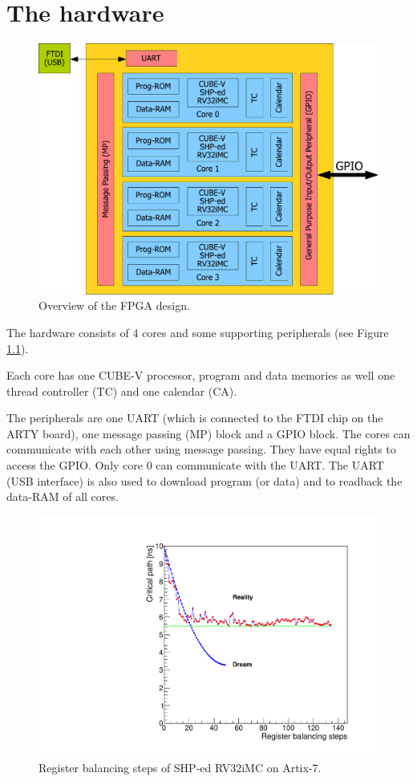 \chapter{The hardware}
\label{atomics}

\begin{figure}[!t]
	\centering
	\includegraphics[width=6in]{figs/overview}
	\caption{Overview of the FPGA design.}
	\label{overview}
\end{figure}

The hardware consists of 4 cores and some supporting peripherals (see Figure \ref{overview}). 

Each core has one CUBE-V processor, program and data memories as well one thread controller (TC) and one calendar (CA). 

The peripherals are one UART (which is connected to the FTDI chip on the ARTY board), one message passing (MP) block and a GPIO block. The cores can communicate with each other using message passing. They have equal rights to access the GPIO. Only core 0 can communicate with the UART. The UART (USB interface) is also used to download program (or data) and to readback the data-RAM of all cores.


\begin{figure}[!t]
	\centering
	\includegraphics[width=6in]{figs/register_balancing}
	\caption{Register balancing steps of SHP-ed RV32iMC on Artix-7.}
	\label{balancing}
\end{figure}

